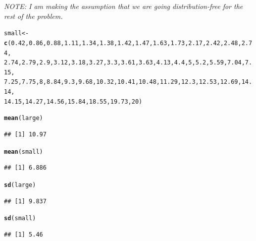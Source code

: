 \documentclass{article}\usepackage{graphicx, color}
\makeatletter
\newcommand{\hlfunctioncall}[1]{\textcolor[rgb]{0.501960784313725,0,0.329411764705882}{\textbf{#1}}}%
\newenvironment{kframe}{%
 \def\at@end@of@kframe{}%
 \ifinner\ifhmode%
  \def\at@end@of@kframe{\end{minipage}}%
  \begin{minipage}{\columnwidth}%
 \fi\fi%
 \def\FrameCommand##1{\hskip\@totalleftmargin \hskip-\fboxsep
 \colorbox{shadecolor}{##1}\hskip-\fboxsep
     \hskip-\linewidth \hskip-\@totalleftmargin \hskip\columnwidth}%
 \MakeFramed {\advance\hsize-\width
   \@totalleftmargin\z@ \linewidth\hsize
   \@setminipage}}%
 {\par\unskip\endMakeFramed%
 \at@end@of@kframe}
\newenvironment{knitrout}{}{} %
\makeatother
\begin{document}
\begin{shaded}
{\sl NOTE: I am making the assumption that we are going distribution-free
for the rest of the problem.}
\begin{knitrout}
\color{fgcolor}\begin{kframe}
\begin{alltt}
small <- \hlfunctioncall{c}(0.42, 0.86, 0.88, 1.11, 1.34, 1.38, 1.42, 1.47, 1.63, 1.73, 2.17, 2.42, 2.48, 2.74, 
    2.74, 2.79, 2.9, 3.12, 3.18, 3.27, 3.3, 3.61, 3.63, 4.13, 4.4, 5, 5.2, 5.59, 7.04, 7.15, 
    7.25, 7.75, 8, 8.84, 9.3, 9.68, 10.32, 10.41, 10.48, 11.29, 12.3, 12.53, 12.69, 14.14, 
    14.15, 14.27, 14.56, 15.84, 18.55, 19.73, 20)

\hlfunctioncall{mean}(large)
\end{alltt}
\begin{verbatim}
## [1] 10.97
\end{verbatim}
\begin{alltt}
\hlfunctioncall{mean}(small)
\end{alltt}
\begin{verbatim}
## [1] 6.886
\end{verbatim}
\begin{alltt}
\hlfunctioncall{sd}(large)
\end{alltt}
\begin{verbatim}
## [1] 9.837
\end{verbatim}
\begin{alltt}
\hlfunctioncall{sd}(small)
\end{alltt}
\begin{verbatim}
## [1] 5.46
\end{verbatim}
\end{kframe}
\end{knitrout}

\end{shaded}
\end{document}
